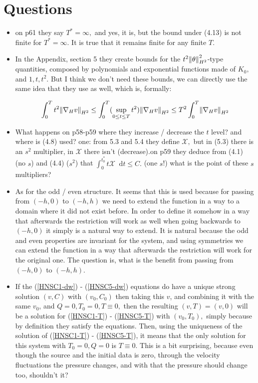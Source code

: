 \documentclass[11pt]{article}
\newcommand*\diff{\mathop{}\!\mathrm{d}}
\begin{document}
\section{Questions}

\begin{itemize}

  \item on p61 they say $T^* = \infty,$ and yes, it is, but the bound under (4.13) is not finite for $T^* = \infty.$ It is true that it remains finite for any finite $T.$

  \item In the Appendix, section 5 they create bounds for the $t^2 \norm{\theta}_{H^2}^2$-type quantities, composed by polynomials and exponential functions made of $K_0,$ and $1, t,t ^2.$ But I think we don't need these bounds, we can directly use the same idea that they use as well, which is, formally:
  
  $$ \int_0^T t^2 \norm{\nabla_H v}_{H^2} \leq \int_0^T (\sup_{0 \leq t \leq T } t^2 )\norm{\nabla_H v}_{H^2} \leq T^2 \int_0^T \norm{\nabla_H v}_{H^2}$$
  
  \item What happens on p58-p59 where they increase / decrease the $t$ level? and where is (4.8) used? one: from 5.3 and 5.4 they define $\mathcal{X},$ but in (5.3) there is an $s^2$ multiplier, in $\mathcal{X}$ there isn't (decrease).on p59 they deduce from (4.1) (no $s$) and (4.4) ($s^2$) that $\int_0^{t_0^*} t \mathcal{X} \diff t \leq C.$ (one $s$!)  what is the point of these $s$ multipliers?

  \item As for the odd / even structure. It seems that this is used because for passing from $(-h, 0)$ to $(-h, h)$ we need to extend the function in a way to a domain where it did not exist before. In order to define it somehow in a way that afterwards the restriction will work as well when going backwards to $(-h, 0)$ it simply is a natural way to extend. It is natural because the odd and even properties are invariant for the system, and using symmetries we can extend the function in a way that afterwards the restriction will work for the original one. The question is, what is the benefit from passing from $(-h, 0)$ to $(-h, h).$

  \item If the (\ref{HNSC1-dw}) - (\ref{HNSC5-dw}) equations do have a unique strong solution $(v, C)$ with $(v_0, C_0)$ then taking this $v$, and combining it with the same $v_0$, and $Q = 0, T_0 = 0, T \equiv 0,$ then the resulting $(v,T) = (v,0)$ will be a solution for (\ref{HNSC1-T}) - (\ref{HNSC5-T}) with $(v_0, T_0),$ simply because by definition they satisfy the equations. Then, using the uniqueness of the solution of (\ref{HNSC1-T}) - (\ref{HNSC5-T}), it means that the only solution for this system with $T_0 = 0, Q = 0$ is $T \equiv 0.$ This is a bit surprising, because even though the source and the initial data is zero, through the velocity fluctuations the pressure changes, and with that the pressure should change too, shouldn't it?

\end{itemize}  
 
\end{document}
